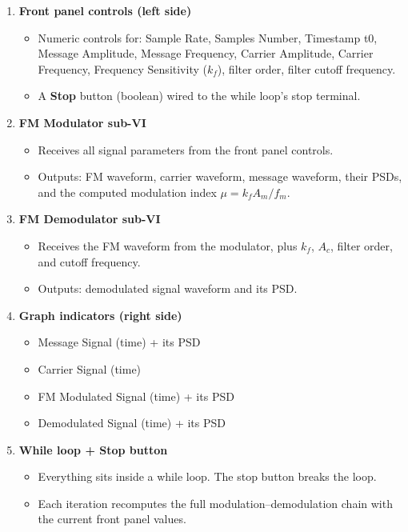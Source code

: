\documentclass[../../main.tex]{subfiles}
\begin{document}
\begin{enumerate}[leftmargin=2em]

\item \textbf{Front panel controls (left side)}
  \begin{itemize}[leftmargin=1.5em]
    \item Numeric controls for: Sample Rate, Samples Number, Timestamp t0, Message Amplitude, Message Frequency, Carrier Amplitude, Carrier Frequency, Frequency Sensitivity ($k_f$), filter order, filter cutoff frequency.
    \item A \textbf{Stop} button (boolean) wired to the while loop's stop terminal.
  \end{itemize}

\item \textbf{FM Modulator sub-VI}
  \begin{itemize}[leftmargin=1.5em]
    \item Receives all signal parameters from the front panel controls.
    \item Outputs: FM waveform, carrier waveform, message waveform, their PSDs, and the computed modulation index $\mu = k_f A_m / f_m$.
  \end{itemize}

\item \textbf{FM Demodulator sub-VI}
  \begin{itemize}[leftmargin=1.5em]
    \item Receives the FM waveform from the modulator, plus $k_f$, $A_c$, filter order, and cutoff frequency.
    \item Outputs: demodulated signal waveform and its PSD.
  \end{itemize}

\item \textbf{Graph indicators (right side)}
  \begin{itemize}[leftmargin=1.5em]
    \item Message Signal (time) + its PSD
    \item Carrier Signal (time)
    \item FM Modulated Signal (time) + its PSD
    \item Demodulated Signal (time) + its PSD
  \end{itemize}

\item \textbf{While loop + Stop button}
  \begin{itemize}[leftmargin=1.5em]
    \item Everything sits inside a while loop. The stop button breaks the loop.
    \item Each iteration recomputes the full modulation--demodulation chain with the current front panel values.
  \end{itemize}

\end{enumerate}
\end{document}
